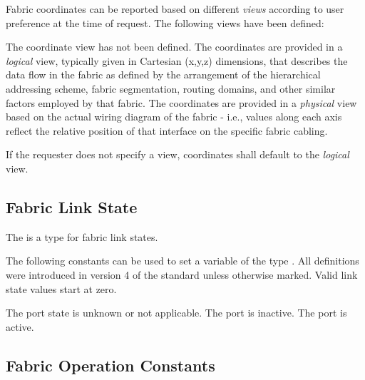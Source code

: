 Fabric coordinates can be reported based on different \emph{views} according to user preference at the time of request. The following views have been defined:

\begin{constantdesc}
%
The coordinate view has not been defined.
%
The coordinates are provided in a \emph{logical} view, typically given in Cartesian (x,y,z) dimensions, that describes the data flow in the fabric as defined by the arrangement of the hierarchical addressing scheme, fabric segmentation, routing domains, and other similar factors employed by that fabric.
%
The coordinates are provided in a \emph{physical} view based on the actual wiring diagram of the fabric - i.e., values along each axis reflect the relative position of that interface on the specific fabric cabling.
%
\end{constantdesc}

If the requester does not specify a view, coordinates shall default to the \emph{logical} view.

\subsection{Fabric Link State}

The  is a  type for fabric link states.


The following constants can be used to set a variable of the type . All definitions were introduced in version 4 of the standard unless otherwise marked. Valid link state values start at zero.

\begin{constantdesc}
%
The port state is unknown or not applicable.
%
The port is inactive.
%
The port is active.
%
\end{constantdesc}

\subsection{Fabric Operation Constants}

